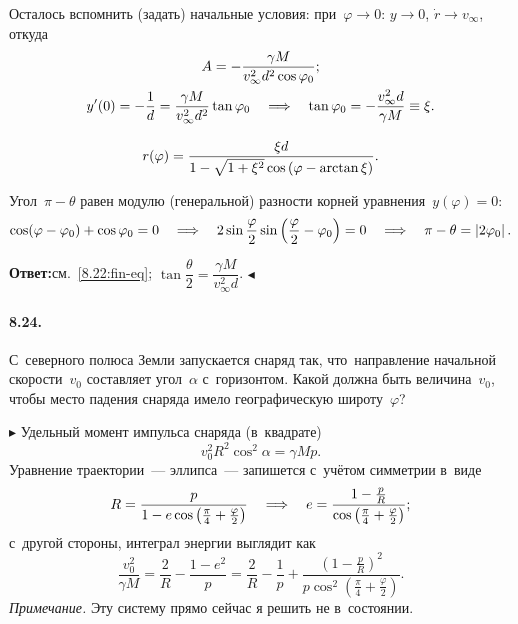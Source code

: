 \documentclass{weekly}
\begin{document}
Осталось вспомнить (задать) начальные условия:
при~$\varphi \to 0$: $y \to 0$, $\dot r \to v_\infty$, откуда
\begin{gather}
    A = -\frac{\gamma M}{v_\infty^2 d^2 \cos\varphi_0}; \\
    y'(0) = -\frac{1}{d} = \frac{\gamma M}{v_\infty^2 d^2} \tan\varphi_0
        \quad \Longrightarrow \quad \tan\varphi_0 = -\frac{v_\infty^2 d}{\gamma M}
        \equiv \xi. \\[2ex]
    r(\varphi) = \frac{\xi d}{1 - \sqrt{1 + \xi^2}
            \cos\left(\varphi - \arctan\xi\right)}.
        \label{8.22:fin-eq}
\end{gather}

Угол~$\pi - \theta$ равен модулю (генеральной) разности корней
уравнения~$y(\varphi) = 0$:
\begin{gather}
    \cos(\varphi - \varphi_0) + \cos\varphi_0 = 0
    \quad \Longrightarrow \quad
    2 \sin\frac{\varphi}{2}
        \sin\left(\frac{\varphi}{2} - \varphi_0\right) = 0
    \quad \Longrightarrow \quad
    \pi - \theta = \left| 2\varphi_0 \right|.
\end{gather}

\textbf{Ответ:}\qquad см.~\eqref{8.22:fin-eq}; \quad
$\tan\dfrac{\theta}{2} = \dfrac{\gamma M}{v_\infty^2 d}$.
\hfill $\blacktriangleleft$


\paragraph{8.24.} С~северного полюса Земли запускается снаряд так,
что~направление начальной скорости~$v_0$ составляет угол~$\alpha$
с~горизонтом. Какой должна быть величина~$v_0$, чтобы место
падения снаряда имело географическую широту~$\varphi$?

$\blacktriangleright$ Удельный момент импульса снаряда (в~квадрате)
\begin{equation}
    v_0^2 R^2 \cos^2\alpha = \gamma M p.
    \label{8.24:mom}
\end{equation}
Уравнение траектории~--- эллипса~--- запишется с~учётом симметрии
в~виде
\begin{equation}
    R = \frac{p}{1 - e\cos\left(
        \frac{\pi}{4} + \frac{\varphi}{2}\right)}
    \quad \Longrightarrow \quad e = \frac{1 - \frac{p}{R}}{\cos\left(
        \frac{\pi}{4} + \frac{\varphi}{2}\right)};
\end{equation}
с~другой стороны, интеграл энергии выглядит как
\begin{equation}
    \frac{v_0^2}{\gamma M}
        = \frac{2}{R} - \frac{1-e^2}{p}
        = \frac{2}{R} - \frac{1}{p} +
            \frac{\left(1 - \frac{p}{R}\right)^2}
            {p \cos^2\left(
            \frac{\pi}{4} + \frac{\varphi}{2}\right)}.
    \label{8.24:eint}
\end{equation}
\textsl{Примечание.} Эту систему прямо сейчас я решить не в~состоянии.
\end{document}
